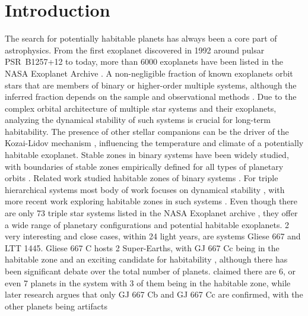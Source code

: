 \documentclass[referee]{aa}
\begin{document}
    \section{Introduction} \label{sec:intro}
    The search for potentially habitable planets has always been a core part of astrophysics. 
    From the first exoplanet discovered in 1992 around pulsar PSR~B1257+12 \citep{WolszczanFrail1992} to today, 
    more than 6000 exoplanets have been listed in the NASA Exoplanet Archive \citep{NASAExoplanetArchiveCounts2026}.
    A non-negligible fraction of known exoplanets orbit stars that are members of binary or higher-order multiple systems,
    although the inferred fraction depends on the sample and observational methods \citep[e.g.][]{Roell2012, 
    MichelMugrauer2021,Schlagenhauf2024, Raghavad2006}. Due to the complex orbital architecture of multiple star systems
    and their exoplanets, analyzing the dynamical stability of such systems is crucial for long-term habitability. The presence of 
    other stellar companions can be the driver of the Kozai-Lidov mechanism \citep[][]{Kozai1962, Lidov1962}, influencing the temperature and climate
    of a potentially habitable exoplanet. Stable zones in binary systems have been widely studied, with boundaries of stable zones
    empirically defined for all types of planetary orbits \citep{HolmanWiegert1999}. Related work studied habitable zones of 
    binary systems \citep[e.g.][]{HaghighipourKaltenegger2013, KalteneggerHaghighipour2013, EgglGeorgakarakos2020}. For triple hierarchical systems most
    body of work focuses on dynamical stability \citep[][]{VerrierEvans2007,Busetti2018}, with more recent work exploring habitable zones in such systems
    \citep[e.g.][]{Muller2014}. 
    Even though there are only 73 triple star systems listed in the NASA Exoplanet archive \citep{NASAExoplanetArchiveCounts2026}
    , they offer a wide range of planetary configurations and potential habitable exoplanets. 2 very interesting
    and close cases, within 24 light years, are systems Gliese 667 and LTT 1445. Gliese 667 C hosts 2 Super-Earths, with GJ 667 Cc being in the habitable zone and an exciting
    candidate for habitability
    \citep[]{AngladaEscudéGJ667, DelfosseHARPS}, although there has been significant debate over the total number of planets. 
    \citep{Anglada2013multipleplanets} claimed there are 6, or even 7 planets in the system with 3 of them being in the habitable zone, while later
    research \citep[][]{FerozHobsonBayesian2014, Robertson2014} argues that only GJ 667 Cb and GJ 667 Cc are confirmed, with the other planets being artifacts
\end{document}
